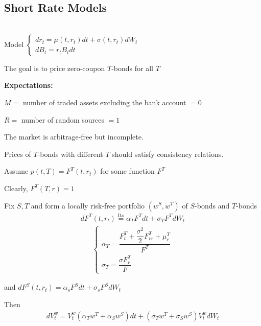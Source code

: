 \subsection{Short Rate Models}\hfill\\
\noindent Model $\begin{cases}
  dr_t = \mu(t,r_t)dt+\sigma(t,r_t)dW_t\\dB_t = r_tB_tdt
\end{cases}$\par
\noindent The goal is to price zero-coupon $T$-bonds for all $T$
\par\bigskip
\noindent\textbf{Expectations:}\par
\noindent $M=$ number of traded assets excluding the bank account $=0$\par
\noindent $R = $ number of random sources $=1$
\par\bigskip
\noindent The market is arbitrage-free but incomplete.\par
\noindent Prices of $T$-bonds with different $T$ should satisfy consistency relations.
\par\bigskip
\noindent Assume $p(t,T) = F^T(t,r_t)$ for some function $F^T$\par
\noindent Clearly, $F^T(T,r) = 1$\par
\noindent Fix $S,T$ and form a locally risk-free portfolio $(w^S,w^T)$ of $S$-bonds and $T$-bonds
\begin{equation*}
  \begin{gathered}
    dF^T(t,r_t)\stackrel{\text{Ito}}{=}\alpha_TF^Tdt+\sigma_TF^TdW_t
  \end{gathered}
\end{equation*}
\begin{equation}
  \begin{gathered}
    \begin{cases}
      \alpha_T = \dfrac{F_t^T+\dfrac{\sigma^2}{2}F_{rr}^T+\mu_r^T}{F^T}\\
      \sigma_T = \dfrac{\sigma F_r^T}{F}
    \end{cases}
  \end{gathered}
\end{equation}\par
\noindent and $dF^S(t,r_t) = \alpha_sF^Sdt+\sigma_sF^SdW_t$\par
\noindent Then
\begin{equation*}
  \begin{gathered}
    dV_t^w = V_t^w(\alpha_Tw^T+\alpha_Sw^S)dt+(\sigma_Tw^T+\sigma_Sw^S)V_t^wdW_t
  \end{gathered}
\end{equation*}\par
